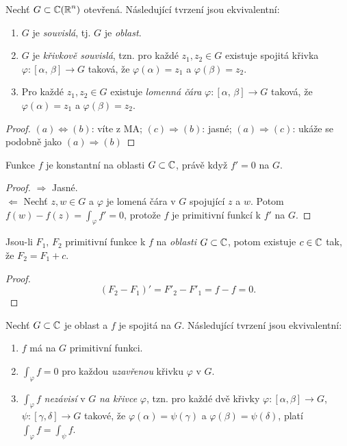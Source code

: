 \begin{reminder}[Souvislost]
Nechť $G\subset\operatorname{\mathbb{C}}  (\operatorname{\mathbb{R}} ^n)$ otevřená. Následující tvrzení jsou ekvivalentní:

\begin{enumerate}[label=(\alph*)]
    \item $G$ je \emph{souvislá}, tj. $G$ je \emph{oblast}.
    \item $G$ je \emph{křivkově souvislá}, tzn. pro každé $z_1,z_2\in G$ existuje spojitá křivka $\varphi:[\alpha,\, \beta]\rightarrow G$ taková, že $\varphi(\alpha)=z_1$ a $\varphi(\beta)=z_2$.
    \item Pro každé $z_1,z_2\in G$ existuje \emph{lomenná čára} $\varphi:[\alpha,\, \beta]\rightarrow G$ taková, že $\varphi(\alpha)=z_1$ a $\varphi(\beta)=z_2$.
\end{enumerate}
\end{reminder}
\begin{proof}
$(a)\iff (b)$: víte z MA; $(c)\Rightarrow(b)$: jasné; $(a)\Rightarrow(c)$: ukáže se podobně jako $(a)\Rightarrow (b)$
\end{proof}

\begin{theorem}
Funkce $f$ je konstantní na oblasti $G\subset\operatorname{\mathbb{C}}  $, právě když $f'=0$ na $G$.
\end{theorem}
\begin{proof}
$\Rightarrow$ Jasné.\\
$\Leftarrow$ Nechť $z,w\in G$ a $\varphi$ je lomená čára v $G$ spojující $z$ a $w$. Potom $f(w)-f(z)=\int_\varphi f'=0$, protože $f$ je primitivní funkcí k $f'$ na $G$.
\end{proof}

\begin{consequence}
Jsou-li $F_1, \, F_2$ primitivní funkce k $f$ na \emph{oblasti} $G\subset\operatorname{\mathbb{C}}  $, potom existuje $c\in\operatorname{\mathbb{C}}  $ tak, že $F_2=F_1+c$.
\end{consequence}

\begin{proof}
$$(F_2-F_1)'=F'_2-F'_1=f-f=0\text{.}$$
\end{proof}

\begin{theorem}\label{thm:oExistenciPF}
Nechť $G\subset\operatorname{\mathbb{C}}  $ je oblast a $f$ je spojitá na $G$. Následující tvrzení jsou ekvivalentní:
\begin{enumerate}
    \item $f$ má na $G$ primitivní funkci.
    \item $\int_\varphi f=0$ pro každou \emph{uzavřenou} křivku $\varphi$ v $G$.
    \item $\int_\varphi f$ \emph{nezávisí} v $G$ \emph{na křivce} $\varphi$, tzn. pro každé dvě křivky $\varphi:[\alpha,\beta]\rightarrow G$, $\psi:[\gamma,\delta]\rightarrow G$ takové, že $\varphi(\alpha)=\psi(\gamma)$ a $\varphi(\beta)=\psi(\delta)$, platí $\int_\varphi f = \int_\psi f$.%
\end{enumerate}
\end{theorem}

